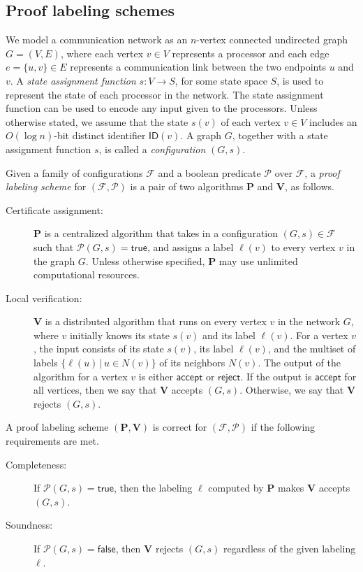 \documentclass[11pt]{article}
\theoremstyle{definition}
\theoremstyle{remark}
\newcommand{\acc}{\mathsf{accept}}
\newcommand{\rej}{\mathsf{reject}}
\newcommand{\true}{\mathsf{true}}
\newcommand{\false}{\mathsf{false}}
\newcommand{\ID}{\mathsf{ID}}
\begin{document}
\subsection{Proof labeling schemes} We model a communication network as an $n$-vertex connected undirected graph $G=(V,E)$, where each vertex $v \in V$ represents a processor and each edge $e=\{u,v\}\in E$ represents a communication link between the two endpoints $u$ and $v$. A \emph{state assignment function}  $s : V \to S$, for some state space $S$, is used to represent the state of each processor in the network. The state assignment function can be used to encode any input given to the processors. Unless otherwise stated, we assume that the state $s(v)$ of each vertex $v \in V$ includes an $O(\log n)$-bit distinct identifier $\ID(v)$. 
A graph $G$, together with a state assignment function $s$, is called a \emph{configuration} $(G,s)$.

Given a family of configurations $\mathcal{F}$ and a boolean predicate $\mathcal{P}$ over $\mathcal{F}$, a \emph{proof labeling scheme} for $(\mathcal{F}, \mathcal{P})$ is a pair of two algorithms $\mathbf{P}$ and $\mathbf{V}$, as follows.
\begin{description}
    \item[Certificate assignment:] $\mathbf{P}$ is a centralized algorithm that takes in a configuration $(G,s) \in \mathcal{F}$ such that $\mathcal{P}(G,s)=\true$, and assigns a label $\ell(v)$ to every vertex $v$ in the graph $G$. Unless otherwise specified, $\mathbf{P}$ may use unlimited computational resources.
    \item[Local verification:] $\mathbf{V}$ is a distributed algorithm that runs on every vertex $v$ in the network $G$, where $v$ initially knows its state $s(v)$ and its label $\ell(v)$. For a vertex $v$, the input consists of its state $s(v)$, its label $\ell(v)$, and the multiset of labels $\{\ell(u) \, | \, u \in N(v)\}$ of its neighbors $N(v)$. The output of the algorithm for a vertex $v$ is either $\acc$ or $\rej$. If the output is $\acc$ for all vertices, then we say that $\mathbf{V}$ accepts $(G,s)$. Otherwise, we say that  $\mathbf{V}$ rejects $(G,s)$.
\end{description}
A proof labeling scheme $(\mathbf{P}, \mathbf{V})$ is correct for $(\mathcal{F}, \mathcal{P})$ if the following requirements are met.
\begin{description}
    \item[Completeness:] If $\mathcal{P}(G,s)=\true$, then the labeling $\ell$ computed by $\mathbf{P}$ makes $\mathbf{V}$ accepts $(G,s)$.
    \item[Soundness:] If $\mathcal{P}(G,s)=\false$, then  $\mathbf{V}$ rejects $(G,s)$ regardless of the given labeling $\ell$. 
\end{description}
\end{document}

